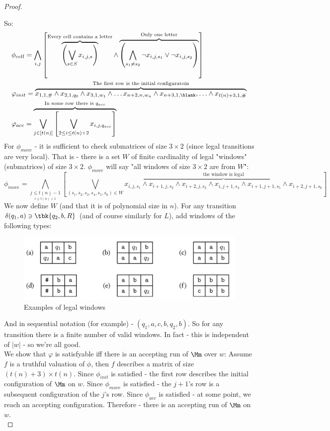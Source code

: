 \begin{proof}
\begin{itemize}
	\end{itemize}
So:
\begin{align*}
		&\phi_{cell} = \bigwedge_{i,j}\left[\overbrace{\left(\bigvee_{s\in S} x_{i,j,s}\right)}^{\text{Every cell contains a letter}}\land \overbrace{\left(\bigwedge_{s_1\neq s_2} \neg x_{i,j,s_1}\lor \neg x_{i,j,s_2}\right)}^\text{Only one letter}\right]\\
		&\varphi_{init} =\overbrace{ x_{1,1,\#}\land x_{2,1,q_0}\land x_{3,1,w_1}\land\ldots x_{n+2,n,w_n}\land x_{n+3,1,\blank},\ldots\land x_{t(n) + 3, 1, \#}}^{\text{The first row is the initial configuratoin}}\\
		& \varphi_{acc} =\overbrace{ \bigvee_{j\in [t(n)]}\left[\bigvee_{2\leq i\leq t(n) + 2} x_{i,j,q_{acc}}\right]}^{\text{In some row there is $q_{acc}$}}\\
\end{align*}
For $\phi_{move}$ - it is sufficient to check submatrices of size $3\times 2$ (since legal transitions are very local). That is - there is a set $W$ of finite cardinality  of legal "windows" (submatrices) of size $3\times 2$. $\phi_{move}$ will say "all windows of size $3\times 2$ are from $W$":
\[
\phi_{move} = \bigwedge_{\underset{i\leq t(n) + 1}{j\leq t(n) - 1}}
\left[\bigvee_{(s_1,s_2,s_3,s_4,s_5,s_6)\in W}\overbrace{x_{i,j,s_1} \land x_{i+1,j, s_2}\land x_{i+2, j ,s_2}\land x_{i, j+1, s_4}\land x_{i+1, j+1, s_5}\land x_{i+2, j+1, s_6}}^{\text{the window is legal}} \right]
\]
We now define $W$ (and that it is of polynomial size in $n$). For any transition $\delta(q_1,a)\ni \tbk{q_2, b,R}$ (and of course similarly for $L$), add windows of the following types:\\
\begin{figure}[H]
	\centering
	\includegraphics[scale=0.5]{cooklevinwindows.jpg}
	\caption{Examples of legal windows}
\end{figure}
And in sequential notation (for example) - $(q_1, a, c, b, q_2, b)$. So for any transition there is a finite number of valid windows. In fact - this is independent of $|w|$ - so we're all good.\\
We show that $\varphi$ is satisfyable iff there is an accepting run of $\Mm$ over $w$: Assume $f$ is a truthful valuation of $\phi$, then $f$ describes a matrix of size $(t(n) +3 )\times t(n)$. Since $\phi_{init}$ is satisfied - the first row describes the initial configuration of $\Mm$ on $w$. Since $\phi_{move}$ is satisfied - the $j+1$'s row is a subsequent configuration of the $j$'s row. Since $\phi_{acc}$ is satisfied - at some point, we reach an accepting configuration. Therefore - there is an accepting run of $\Mm$ on $w$.\\

\end{proof}
